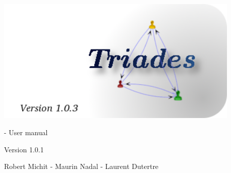 \begin{titlepage}
~\\
\vspace{50pt}

\begin{center}
\includegraphics[height = 6cm]{images/splashScreen.png} 


\vspace{230pt}
\begin{Huge}
\tria - User manual\\
\end{Huge}
\begin{Large}
\vspace{20pt}
Version 1.0.1\\

\end{Large}
Robert Michit - Maurin Nadal - Laurent Dutertre
\end{center}

\end{titlepage}

